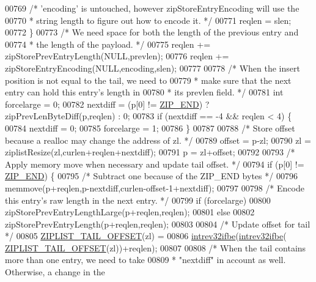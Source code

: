 \begin{DoxyCode}
{{00769         \textcolor{comment}{/* 'encoding' is untouched, however zipStoreEntryEncoding will use the}
00770 \textcolor{comment}{         * string length to figure out how to encode it. */}
00771         reqlen = slen;
00772     \}
00773     \textcolor{comment}{/* We need space for both the length of the previous entry and}
00774 \textcolor{comment}{     * the length of the payload. */}
00775     reqlen += zipStorePrevEntryLength(NULL,prevlen);
00776     reqlen += zipStoreEntryEncoding(NULL,encoding,slen);
00777 
00778     \textcolor{comment}{/* When the insert position is not equal to the tail, we need to}
00779 \textcolor{comment}{     * make sure that the next entry can hold this entry's length in}
00780 \textcolor{comment}{     * its prevlen field. */}
00781     \textcolor{keywordtype}{int} forcelarge = 0;
00782     nextdiff = (p[0] != \hyperlink{ziplist_8c_a31a8f9d5b5bad75318741cfca5de5ea8}{ZIP\_END}) ? zipPrevLenByteDiff(p,reqlen) : 0;
00783     \textcolor{keywordflow}{if} (nextdiff == -4 && reqlen < 4) \{
00784         nextdiff = 0;
00785         forcelarge = 1;
00786     \}
00787 
00788     \textcolor{comment}{/* Store offset because a realloc may change the address of zl. */}
00789     offset = p-zl;
00790     zl = ziplistResize(zl,curlen+reqlen+nextdiff);
00791     p = zl+offset;
00792 
00793     \textcolor{comment}{/* Apply memory move when necessary and update tail offset. */}
00794     \textcolor{keywordflow}{if} (p[0] != \hyperlink{ziplist_8c_a31a8f9d5b5bad75318741cfca5de5ea8}{ZIP\_END}) \{
00795         \textcolor{comment}{/* Subtract one because of the ZIP\_END bytes */}
00796         memmove(p+reqlen,p-nextdiff,curlen-offset-1+nextdiff);
00797 
00798         \textcolor{comment}{/* Encode this entry's raw length in the next entry. */}
00799         \textcolor{keywordflow}{if} (forcelarge)
00800             zipStorePrevEntryLengthLarge(p+reqlen,reqlen);
00801         \textcolor{keywordflow}{else}
00802             zipStorePrevEntryLength(p+reqlen,reqlen);
00803 
00804         \textcolor{comment}{/* Update offset for tail */}
00805         \hyperlink{ziplist_8c_adf2235d74c81861c85fb5d2ffa209397}{ZIPLIST\_TAIL\_OFFSET}(zl) =
00806             \hyperlink{endianconv_8h_a4e85d9ae58a3b1e6ceaabfd4689002c7}{intrev32ifbe}(\hyperlink{endianconv_8h_a4e85d9ae58a3b1e6ceaabfd4689002c7}{intrev32ifbe}(
      \hyperlink{ziplist_8c_adf2235d74c81861c85fb5d2ffa209397}{ZIPLIST\_TAIL\_OFFSET}(zl))+reqlen);
00807 
00808         \textcolor{comment}{/* When the tail contains more than one entry, we need to take}
00809 \textcolor{comment}{         * "nextdiff" in account as well. Otherwise, a change in the}
}}
\end{DoxyCode}

